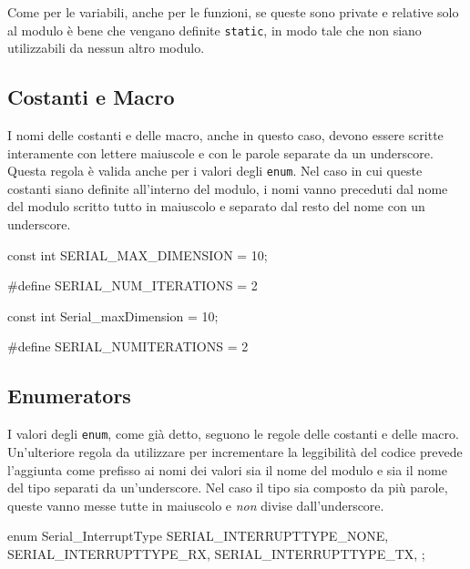 Come per le variabili, anche per le funzioni, se queste sono private e relative solo al modulo è bene che vengano definite \texttt{static}, in modo tale che non siano utilizzabili da nessun altro modulo.

\subsection{Costanti e Macro}\label{ssec:econstantname}

I nomi delle costanti e delle macro, anche in questo caso, devono essere scritte interamente con lettere maiuscole e con le parole separate da un underscore\cite{codestyle:geotechnical}.
Questa regola è valida anche per i valori degli \texttt{enum}.
Nel caso in cui queste costanti siano definite all'interno del modulo, i nomi vanno preceduti dal nome del modulo scritto tutto in maiuscolo e separato dal resto del nome con un underscore.

\noindent\begin{minipage}[t]{\cbwidth}
\begin{RightCode}
const int SERIAL_MAX_DIMENSION = 10;

#define SERIAL_NUM_ITERATIONS  = 2
\end{RightCode}
\end{minipage}%
\hspace{\cbdistance}
\begin{minipage}[t]{\cbwidth}
\begin{ErrorCode}
const int Serial_maxDimension = 10;

#define SERIAL_NUMITERATIONS  = 2
\end{ErrorCode}
\end{minipage}

\subsection{Enumerators}\label{ssec:aenumname}

I valori degli \texttt{enum}, come già detto, seguono le regole delle costanti e delle macro.
Un'ulteriore regola da utilizzare per incrementare la leggibilità del codice prevede l'aggiunta come prefisso ai nomi dei valori sia il nome del modulo e sia il nome del tipo separati da un'underscore.
Nel caso il tipo sia composto da più parole, queste vanno messe tutte in maiuscolo e \emph{non} divise dall'underscore.

\noindent\begin{minipage}[t]{\rbwidth}
\begin{RightCode}
enum Serial_InterruptType
{
    SERIAL_INTERRUPTTYPE_NONE,
    SERIAL_INTERRUPTTYPE_RX,
    SERIAL_INTERRUPTTYPE_TX,
};
\end{RightCode}
\end{minipage}